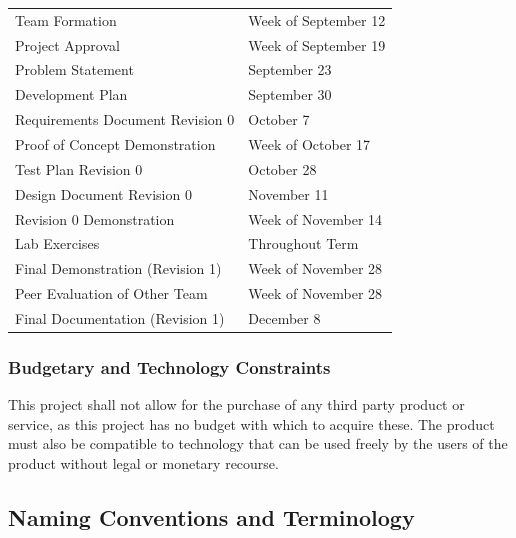 \documentclass[12pt, titlepage]{article}
\begin{document}
\begin{tabular}{ p{6.7cm} l}

  Team Formation & Week of September 12\\

  Project Approval & Week of September 19\\

  Problem Statement & September 23\\

  Development Plan & September 30\\

  Requirements Document Revision 0 & October 7\\

  Proof of Concept Demonstration & Week of October 17\\

  Test Plan Revision 0 & October 28\\

  Design Document Revision 0 & November 11\\

  Revision 0 Demonstration & Week of November 14\\

  Lab Exercises & Throughout Term\\

  Final Demonstration (Revision 1) & Week of November 28\\

  Peer Evaluation of Other Team & Week of November 28\\

  Final Documentation (Revision 1) & December 8\\

\end{tabular}

\subsubsection{Budgetary and Technology Constraints}
This project shall not allow for the purchase of any third party product or 
service, as this project has no budget with which to acquire these. The product 
must also be compatible to technology that can be used freely by the users of 
the product without legal or monetary recourse.

\subsection{Naming Conventions and Terminology}
\end{document}
